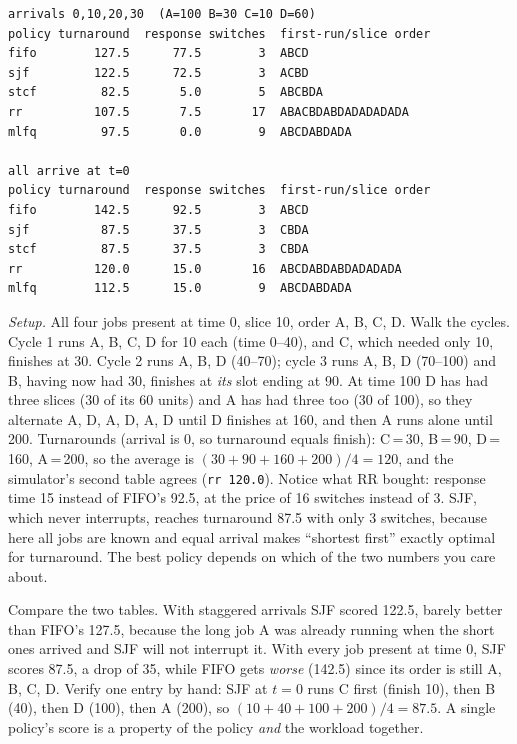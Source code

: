 \begin{lstlisting}[basicstyle=\ttfamily\scriptsize,caption={Real output of
\texttt{python3 ch12\_sched\_sim.py}. The \texttt{switches} column
counts how many times the core changed from one job to another.}]
arrivals 0,10,20,30  (A=100 B=30 C=10 D=60)
policy turnaround  response switches  first-run/slice order
fifo        127.5      77.5        3  ABCD
sjf         122.5      72.5        3  ACBD
stcf         82.5       5.0        5  ABCBDA
rr          107.5       7.5       17  ABACBDABDADADADADA
mlfq         97.5       0.0        9  ABCDABDADA

all arrive at t=0
policy turnaround  response switches  first-run/slice order
fifo        142.5      92.5        3  ABCD
sjf          87.5      37.5        3  CBDA
stcf         87.5      37.5        3  CBDA
rr          120.0      15.0       16  ABCDABDABDADADADA
mlfq        112.5      15.0        9  ABCDABDADA
\end{lstlisting}

\begin{example}
\emph{Setup.} All four jobs present at time 0, slice 10, order
A, B, C, D. Walk the cycles. Cycle 1 runs A, B, C, D for 10 each
(time 0--40), and C, which needed only 10, finishes at 30. Cycle 2
runs A, B, D (40--70); cycle 3 runs A, B, D (70--100) and B, having
now had 30, finishes at \emph{its} slot ending at 90. At time 100
D has had three slices (30 of its 60 units) and A has had three too
(30 of 100), so they alternate A, D, A, D, A, D until D finishes at
160, and then A runs alone until 200. Turnarounds (arrival is 0, so turnaround
equals finish): C\,=\,30, B\,=\,90, D\,=\,160, A\,=\,200, so the average is
$(30+90+160+200)/4=120$, and the simulator's second table agrees
(\texttt{rr 120.0}). Notice what RR bought: response time 15 instead
of FIFO's 92.5, at the price of 16 switches instead of 3. SJF, which
never interrupts, reaches turnaround 87.5 with only 3 switches,
because here all jobs are known and equal arrival makes ``shortest
first'' exactly optimal for turnaround. The best policy depends on
which of the two numbers you care about.
\end{example}

\begin{example}
Compare the two tables. With staggered arrivals SJF scored 122.5,
barely better than FIFO's 127.5, because the long job A was already
running when the short ones arrived and SJF will not interrupt it.
With every job present at time 0, SJF scores 87.5, a drop of 35,
while FIFO gets \emph{worse} (142.5) since its order is still
A, B, C, D. Verify one entry by hand: SJF at $t=0$ runs C first
(finish 10), then B (40), then D (100), then A (200), so
$(10+40+100+200)/4=87.5$. A single policy's score is a property of
the policy \emph{and} the workload together.
\end{example}

